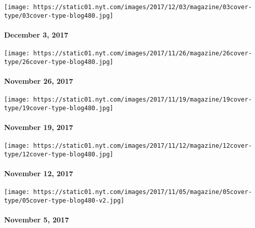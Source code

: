 \texttt{[image: https://static01.nyt.com/images/2017/12/03/magazine/03cover-type/03cover-type-blog480.jpg]}

\hypertarget{december-3-2017}{%
\paragraph{December 3, 2017}\label{december-3-2017}}

\href{https://www.nytimes.com/issue/magazine/2017/11/27/112617-issue}{}

\texttt{[image: https://static01.nyt.com/images/2017/11/26/magazine/26cover-type/26cover-type-blog480.jpg]}

\hypertarget{november-26-2017}{%
\paragraph{November 26, 2017}\label{november-26-2017}}

\href{https://www.nytimes.com/issue/magazine/2017/11/17/111917-issue}{}

\texttt{[image: https://static01.nyt.com/images/2017/11/19/magazine/19cover-type/19cover-type-blog480.jpg]}

\hypertarget{november-19-2017}{%
\paragraph{November 19, 2017}\label{november-19-2017}}

\href{https://www.nytimes.com/interactive/2017/11/07/magazine/tech-design-future-autonomous-cars-american-interstate-highway-roads-suburbs.html}{}

\texttt{[image: https://static01.nyt.com/images/2017/11/12/magazine/12cover-type/12cover-type-blog480.jpg]}

\hypertarget{november-12-2017}{%
\paragraph{November 12, 2017}\label{november-12-2017}}

\href{https://www.nytimes.com/issue/magazine/2017/11/03/110517-issue}{}

\texttt{[image: https://static01.nyt.com/images/2017/11/05/magazine/05cover-type/05cover-type-blog480-v2.jpg]}

\hypertarget{november-5-2017}{%
\paragraph{November 5, 2017}\label{november-5-2017}}

